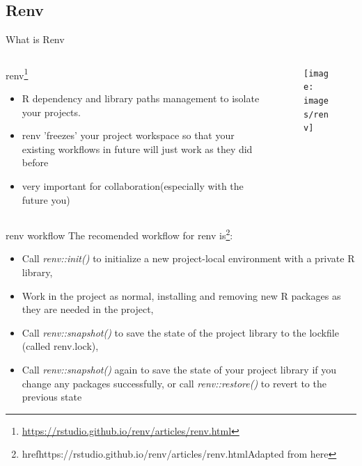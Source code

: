 \documentclass[fleqn]{beamer}\usepackage[]{graphicx}\usepackage[]{color}
\begin{document}
\subsection{Renv}
\begin{frame}{What is Renv}
\begin{columns}[T] %
\begin{column}{.48\textwidth}
renv\footnote{\href{https://rstudio.github.io/renv/articles/renv.html}{https://rstudio.github.io/renv/articles/renv.html}}
\begin{itemize}
  \item R dependency and library paths management to isolate your projects.
  \item renv 'freezes' your project workspace so that your existing workflows in future will just work as they did before
  \item very important for collaboration(especially with the future you)
\end{itemize}
\end{column}%
\hfill%
\begin{column}{.48\textwidth}
\begin{figure}[htp]
    \centering
    \texttt{[image: images/renv]}
\end{figure}
\end{column}%
\end{columns}
\end{frame}

\begin{frame}{renv workflow}
The recomended workflow for renv is\footnote{href{https://rstudio.github.io/renv/articles/renv.html}{Adapted from here}}:
\begin{itemize}
\item Call \textit{renv::init()} to initialize a new project-local environment with a private R library,

\item Work in the project as normal, installing and removing new R packages as they are needed in the project,

\item Call \textit{renv::snapshot()} to save the state of the project library to the lockfile (called renv.lock),


\item Call \textit{renv::snapshot()} again to save the state of your project library if you change any packages successfully, or call \textit{renv::restore()} to revert to the previous state 
\end{itemize}
\end{frame}
\end{document}

